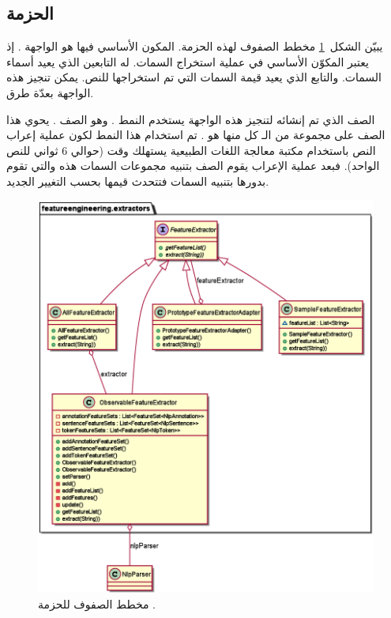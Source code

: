 \subsection{الحزمة }
يبيّن الشكل~\ref{fig:cd:extractors} مخطط الصفوف لهذه الحزمة.
المكون الأساسي فيها هو الواجهة .
إذ يعتبر المكوّن الأساسي في عملية استخراج السمات.
له التابعين
الذي يعيد أسماء السمات.
والتابع
الذي يعيد قيمة السمات التي تم استخراجها للنص.
يمكن تنجيز هذه الواجهة بعدّة طرق.

الصف الذي تم إنشائه لتنجيز هذه الواجهة يستخدم النمط .
وهو الصف .
يحوي هذا الصف على مجموعة من الـ  كل منها هو .
تم استخدام هذا النمط لكون عملية إعراب النص 
باستخدام مكتبة معالجة اللغات الطبيعية يستهلك وقت (حوالي 6 ثواني للنص الواحد).
فبعد عملية الإعراب يقوم الصف بتنبيه مجموعات السمات هذه والتي تقوم بدورها بتنبيه السمات فتتحدث قيمها بحسب التغيير الجديد.

\begin{figure}[htb]
	\centering
	\includegraphics[width=0.8\linewidth]{images/cd-extractors.eps}
	\caption{%
		مخطط الصفوف للحزمة .
	}
	\label{fig:cd:extractors}
\end{figure}



